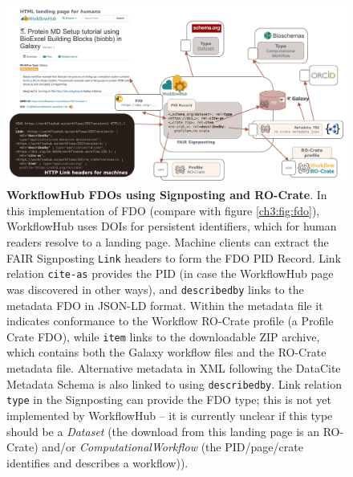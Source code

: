 \begin{figure}[htb]
  \includegraphics[width=\textwidth]{figures/ch09/signposting.pdf}
    \caption[WorkflowHub FDOs using Signposting and RO-Crate]{\textbf{WorkflowHub FDOs using Signposting and RO-Crate}. In this implementation of FDO (compare with figure \vref{ch3:fig:fdo}), WorkflowHub uses DOIs for persistent identifiers, which for human readers resolve to a landing page. Machine clients can extract the FAIR Signposting \texttt{Link} headers \cite{Van de Sompel 2022} to form the FDO PID Record. Link relation \texttt{cite-as} provides the PID \cite{Bayarri 2022} (in case the WorkflowHub page was discovered in other ways), and \texttt{describedby} links to the metadata FDO in JSON-LD format. Within the metadata file it indicates conformance to the Workflow RO-Crate profile (a Profile Crate FDO), while \texttt{item} links to the downloadable ZIP archive, which contains both the Galaxy workflow files and the RO-Crate metadata file. Alternative metadata in XML following the DataCite Metadata Schema is also linked to using \texttt{describedby}. Link relation \texttt{type} in the Signposting can provide the FDO type; this is not yet implemented by WorkflowHub -- it is currently unclear if this type should be a \emph{Dataset} (the download from this landing page is an RO-Crate) and/or \emph{ComputationalWorkflow} (the PID/page/crate identifies and describes a workflow)).
    }
  \label{ch9:fig:signposting}
\end{figure}
